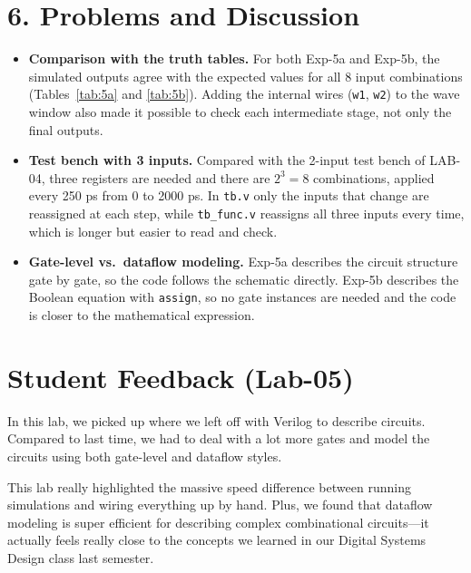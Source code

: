 \section*{6. Problems and Discussion}

\begin{itemize}[leftmargin=*]
    \item \textbf{Comparison with the truth tables.} For both Exp-5a and Exp-5b, the simulated outputs agree with the expected values for all 8 input combinations (Tables~\ref{tab:5a} and \ref{tab:5b}). Adding the internal wires (\texttt{w1}, \texttt{w2}) to the wave window also made it possible to check each intermediate stage, not only the final outputs.
    \item \textbf{Test bench with 3 inputs.} Compared with the 2-input test bench of LAB-04, three registers are needed and there are $2^3 = 8$ combinations, applied every 250 ps from 0 to 2000 ps. In \texttt{tb.v} only the inputs that change are reassigned at each step, while \texttt{tb\_func.v} reassigns all three inputs every time, which is longer but easier to read and check.
    \item \textbf{Gate-level vs.\ dataflow modeling.} Exp-5a describes the circuit structure gate by gate, so the code follows the schematic directly. Exp-5b describes the Boolean equation with \texttt{assign}, so no gate instances are needed and the code is closer to the mathematical expression.
\end{itemize}

\section*{Student Feedback (Lab-05)}
In this lab, we picked up where we left off with Verilog to describe circuits. Compared to last time, we had to deal with a lot more gates and model the circuits using both gate-level and dataflow styles. 

This lab really highlighted the massive speed difference between running simulations and wiring everything up by hand. Plus, we found that dataflow modeling is super efficient for describing complex combinational circuits—it actually feels really close to the concepts we learned in our Digital Systems Design class last semester.